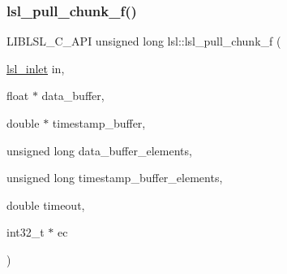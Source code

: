 \subsubsection{\texorpdfstring{lsl\+\_\+pull\+\_\+chunk\+\_\+f()}{lsl\_pull\_chunk\_f()}}
{\footnotesize\ttfamily L\+I\+B\+L\+S\+L\+\_\+\+C\+\_\+\+A\+PI unsigned long lsl\+::lsl\+\_\+pull\+\_\+chunk\+\_\+f (\begin{DoxyParamCaption}\item[{\hyperlink{namespacelsl_a884a3363cfcba75d7ce8f00c1c4c54f1}{lsl\+\_\+inlet}}]{in,  }\item[{float $\ast$}]{data\+\_\+buffer,  }\item[{double $\ast$}]{timestamp\+\_\+buffer,  }\item[{unsigned long}]{data\+\_\+buffer\+\_\+elements,  }\item[{unsigned long}]{timestamp\+\_\+buffer\+\_\+elements,  }\item[{double}]{timeout,  }\item[{int32\+\_\+t $\ast$}]{ec }\end{DoxyParamCaption})}

